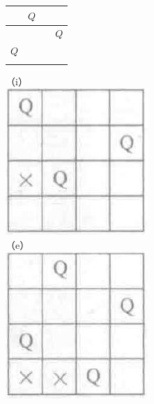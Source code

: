 \documentclass[10pt]{article}
\begin{document}
\begin{center}
\begin{tabular}{|l|l|l|l|}
\hline
 & $Q$ &  &  \\
\hline
 &  &  & $Q$ \\
\hline
$Q$ &  &  &  \\
\hline
 &  &  &  \\
\hline
\end{tabular}
\end{center}

（i）\\
\includegraphics[max width=\textwidth, center]{2025_06_06_704745ea57b15b2333e5g-135(6)}\\
（e）\\
\includegraphics[max width=\textwidth, center]{2025_06_06_704745ea57b15b2333e5g-135(7)}\\
\end{document}
